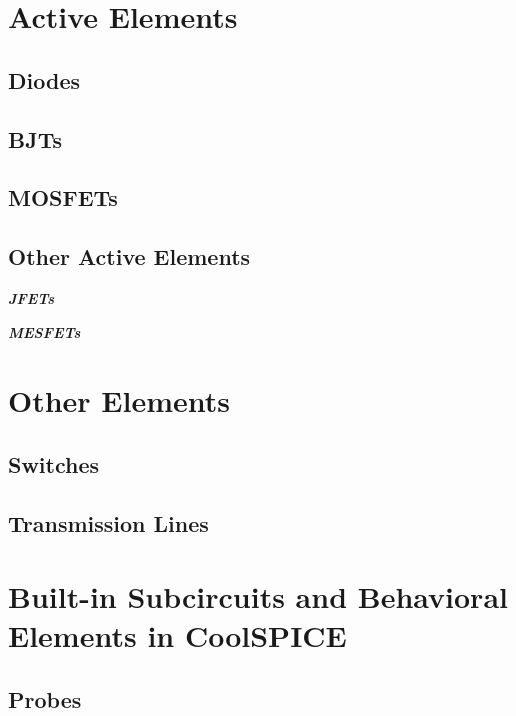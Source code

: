\section{Active Elements}
\label{sec_sceadm_activeelements}

\subsection{Diodes}
\label{subsec_sceadm_diodes}

\subsection{BJTs}
\label{subsec_sceadm_bjts}

\subsection{MOSFETs}
\label{subsec_sceadm_mosfets}

\subsection{Other Active Elements}
\label{subsec_sceadm_otheractiveelements}

\textbf{\textit{JFETs}}


\textbf{\textit{MESFETs}}



\section{Other Elements}
\label{sec_sceadm_otherelements}

\subsection{Switches}
\label{subsec_sceadm_switches}

\subsection{Transmission Lines}
\label{subsec_sceadm_transmissionlines}

\section{Built-in Subcircuits and Behavioral Elements in CoolSPICE}
\label{sec_sceadm_builtinsubcircuits}

\subsection{Probes}
\label{subsec_sceadm_probes}

